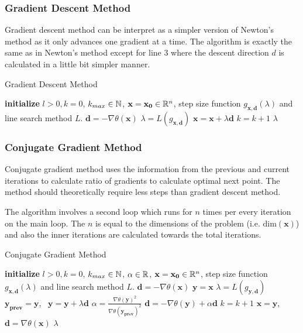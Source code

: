 \documentclass[a4paper,english,titlepage,12pt]{article}
\newcommand{\vect}[1]{\ensuremath{\mathbf{#1}}}
\newcommand{\norm}[1]{\ensuremath\Vert #1 \Vert}
\newcommand{\R}{\ensuremath\mathbb{R}}
\newcommand{\N}{\ensuremath\mathbb{N}}
\begin{document}
\subsubsection{Gradient Descent Method}


Gradient descent method can be interpret as a simpler version of Newton's method as it only advances one gradient at a time. The algorithm is exactly the same as in Newton's method except for line 3 where the descent direction $d$ is calculated in a little bit simpler manner.

\begin{algorithm}[H]
\caption{Gradient Descent Method}
\label{alg_gradient_descent}
\begin{algorithmic}[1]
\STATE \textbf{initialize} $l > 0, k = 0$, $k_{max} \in \N$, $\vect{x} = \vect{x_0} \in \R^n$, step size function $g_{\vect{x}, \vect{d}}(\lambda)$ and line search method $L$.
\WHILE{$\norm{\nabla \theta(\vect{x})} > l$ \AND $k < k_{max}$}
    \STATE $\vect{d} = -\nabla \theta(\vect{x})$
    \STATE $\lambda = L(g_{\vect{x}, \vect{d}})$
    \STATE $\vect{x} = \vect{x} + \lambda \vect{d}$
    \STATE $k = k + 1$
\ENDWHILE
\RETURN $\lambda$
\end{algorithmic}
\end{algorithm}


\subsubsection{Conjugate Gradient Method}


Conjugate gradient method uses the information from the previous and current iterations to calculate ratio of gradients to calculate optimal next point. The method should theoretically  require less steps than gradient descent method.

The algorithm involves a second loop which runs for $n$ times per every iteration on the main loop. The $n$ is equal to the dimensions of the problem (i.e. $\mathrm{dim}(\vect{x})$) and also the inner iterations are calculated towards the total iterations.

\begin{algorithm}[H]
\caption{Conjugate Gradient Method}
\label{alg_conjugate_gradient}
\begin{algorithmic}[1]
\STATE \textbf{initialize} $l > 0, k = 0$, $k_{max} \in \N$, $\alpha \in \R$, $\vect{x} = \vect{x_0} \in \R^n$, step size function $g_{\vect{x}, \vect{d}}(\lambda)$ and line search method $L$.
\STATE $\vect{d} = -\nabla \theta(\vect{x})$
\WHILE{$\norm{\nabla \theta(\vect{x})} > l$ \AND $k < k_{max}$}
    \STATE $\vect{y} = \vect{x}$
        \STATE $\lambda = L(g_{\vect{y}, \vect{d}})$
        \STATE $\vect{y_{prev}} = \vect{y}$, \ $\vect{y} = \vect{y} + \lambda \vect{d}$
        \STATE $\alpha = \frac{\nabla \theta(\vect{y})^2}{\nabla \theta(\vect{y_{prev}})^2}$
        \STATE $\vect{d} = -\nabla \theta(\vect{y}) + \alpha \vect{d}$
        \STATE $k = k + 1$
    \ENDFOR
    \STATE $\vect{x} = \vect{y}$, \ $\vect{d} = \nabla \theta(\vect{x})$
\ENDWHILE
\RETURN $\lambda$
\end{algorithmic}
\end{algorithm}
\end{document}
